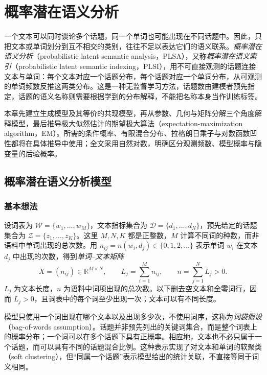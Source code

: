\setcounter{chapter}{18} %
\chapter{概率潜在语义分析}
\label{ch:lh-plsa}

一个文本可以同时谈论多个话题，同一个单词也可能出现在不同话题中。因此，只把文本或单词划分到互不相交的类别，往往不足以表达它们的语义联系。\emph{概率潜在语义分析}（probabilistic latent semantic analysis，PLSA），又称\emph{概率潜在语义索引}（probabilistic latent semantic indexing，PLSI），用不可直接观测的话题连接文本与单词：每个文本对应一个话题分布，每个话题对应一个单词分布，从可观测的单词频数反推这两类分布。这是一种无监督学习方法，话题数由建模者预先指定，话题的语义名称则需要根据学到的分布解释，不能把名称本身当作训练标签。

本章先建立生成模型及其等价的共现模型，再从参数、几何与矩阵分解三个角度解释模型，最后推导极大似然估计的期望极大算法（expectation-maximization algorithm，EM）。所需的条件概率、有限混合分布、拉格朗日乘子与对数函数凹性都将在具体推导中使用；全文采用自然对数，明确区分观测频数、模型概率与隐变量的后验概率。

\section{概率潜在语义分析模型}
\label{sec:lh-plsa-model}

\subsection{基本想法}
\label{subsec:lh-plsa-idea}

设词表为 $\mathcal W=\{w_1,\ldots,w_M\}$，文本指标集合为 $\mathcal D=\{d_1,\ldots,d_N\}$，预先给定的话题集合为 $\mathcal Z=\{z_1,\ldots,z_K\}$。这里 $M,N,K$ 都是正整数，$M$ 计算不同词的种数，而非语料中单词出现的总次数。用 $n_{ij}=n(w_i,d_j)\in\{0,1,2,\ldots\}$ 表示单词 $w_i$ 在文本 $d_j$ 中出现的次数，得到\emph{单词--文本矩阵}
\begin{equation}
X=(n_{ij})\in\mathbb R^{M\times N},\qquad
L_j=\sum_{i=1}^M n_{ij},\qquad
n=\sum_{j=1}^N L_j>0.
\label{eq:lh-plsa-counts}
\end{equation}
$L_j$ 为文本长度，$n$ 为语料中词项出现的总次数。以下删去空文本和全零词行，因而 $L_j>0$，且词表中的每个词至少出现一次；文本可以有不同长度。

模型只使用一个词出现在哪个文本以及出现多少次，不使用词序，这称为\emph{词袋假设}（bag-of-words assumption）。话题并非预先列出的关键词集合，而是整个词表上的概率分布；一个词可以在多个话题下具有正概率。相应地，文本也不必只属于一个话题，而可以具有不同的话题混合比例。这种表示实现了对文本和单词的软聚类（soft clustering），但“同属一个话题”表示模型给出的统计关联，不直接等同于词义相同。

